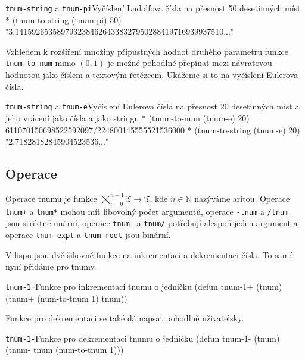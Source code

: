 \begin{lisptest}{\texttt{tnum-string} a \texttt{tnum-pi}}{Vyčíslení Ludolfova čísla na přesnost 50 desetinných míst}
* (tnum-to-string (tnum-pi) 50)
"3.14159265358979323846264338327950288419716939937510..."
\end{lisptest}

Vzhledem k rozšíření množiny přípustných hodnot druhého parametru funkce \texttt{tnum-to-num} mimo $(0,1)$ je možné pohodlně přepínat mezi návratovou hodnotou jako číslem a textovým řetězcem. Ukážeme si to na vyčíslení Eulerova čísla.

\begin{lisptest}{\texttt{tnum-string} a \texttt{tnum-e}}{Vyčíslení Eulerova čísla na přesnost 20 desetinných míst a jeho vrácení jako čísla a jako stringu}
* (tnum-to-num (tnum-e) 20)
611070150698522592097/224800145555521536000
* (tnum-to-string (tnum-e) 20)
"2.71828182845904523536..."
\end{lisptest}

\subsection{Operace}
Operace tnumu je funkce $\bigtimes_{i=0}^{n-1}\mathfrak{T}\rightarrow\mathfrak{T}$, kde $n\in\mathbb{N}$ nazýváme aritou. Operace \texttt{tnum+} a \texttt{tnum*} mohou mít libovolný počet argumentů, operace \texttt{-tnum} a \texttt{/tnum} jsou striktně unární, operace \texttt{tnum-} a \texttt{tnum/} potřebují alespoň jeden argument a operace \texttt{tnum-expt} a \texttt{tnum-root} jsou binární.

V lispu jsou dvě šikovné funkce na inkrementaci a dekrementaci čísla. To samé nyní přidáme pro tnumy.

\begin{lispcode}{\texttt{tnum-1+}}{Funkce pro inkrementaci tnumu o jedničku}
(\textcolor{funkcionalni}{defun} \textcolor{pojmenovan}{tnum-1+} (tnum)
  (\textcolor{moje}{tnum+} (\textcolor{moje}{num-to-tnum} 1) tnum))
\end{lispcode}

Funkce pro dekrementaci se také dá napsat pohodlně uživatelsky.

\begin{lispcode}{\texttt{tnum-1-}}{Funkce pro dekrementaci tnumu o jedničku}
(\textcolor{funkcionalni}{defun} \textcolor{pojmenovan}{tnum-1-} (tnum)
  (\textcolor{moje}{tnum-} tnum (\textcolor{moje}{num-to-tnum} 1)))
\end{lispcode}


